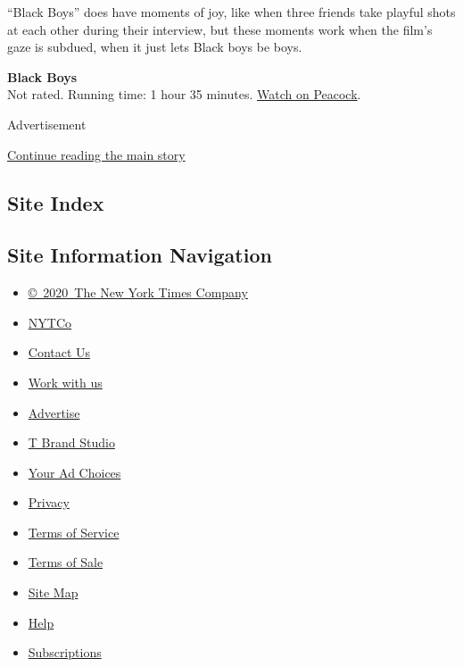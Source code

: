 ``Black Boys'' does have moments of joy, like when three friends take
playful shots at each other during their interview, but these moments
work when the film's gaze is subdued, when it just lets Black boys be
boys.

\textbf{Black Boys}\\
Not rated. Running time: 1 hour 35 minutes.
\href{https://www.peacocktv.com/watch/asset/movies/documentary/black-boys/0ec3eefe-f60f-3d73-921b-c4307e571a0b}{Watch
on Peacock}.

Advertisement

\protect\hyperlink{after-bottom}{Continue reading the main story}

\hypertarget{site-index}{%
\subsection{Site Index}\label{site-index}}

\hypertarget{site-information-navigation}{%
\subsection{Site Information
Navigation}\label{site-information-navigation}}

\begin{itemize}
\tightlist
\item
  \href{https://help.nytimes3xbfgragh.onion/hc/en-us/articles/115014792127-Copyright-notice}{©~2020~The
  New York Times Company}
\end{itemize}

\begin{itemize}
\tightlist
\item
  \href{https://www.nytco.com/}{NYTCo}
\item
  \href{https://help.nytimes3xbfgragh.onion/hc/en-us/articles/115015385887-Contact-Us}{Contact
  Us}
\item
  \href{https://www.nytco.com/careers/}{Work with us}
\item
  \href{https://nytmediakit.com/}{Advertise}
\item
  \href{http://www.tbrandstudio.com/}{T Brand Studio}
\item
  \href{https://www.nytimes3xbfgragh.onion/privacy/cookie-policy\#how-do-i-manage-trackers}{Your
  Ad Choices}
\item
  \href{https://www.nytimes3xbfgragh.onion/privacy}{Privacy}
\item
  \href{https://help.nytimes3xbfgragh.onion/hc/en-us/articles/115014893428-Terms-of-service}{Terms
  of Service}
\item
  \href{https://help.nytimes3xbfgragh.onion/hc/en-us/articles/115014893968-Terms-of-sale}{Terms
  of Sale}
\item
  \href{https://spiderbites.nytimes3xbfgragh.onion}{Site Map}
\item
  \href{https://help.nytimes3xbfgragh.onion/hc/en-us}{Help}
\item
  \href{https://www.nytimes3xbfgragh.onion/subscription?campaignId=37WXW}{Subscriptions}
\end{itemize}
